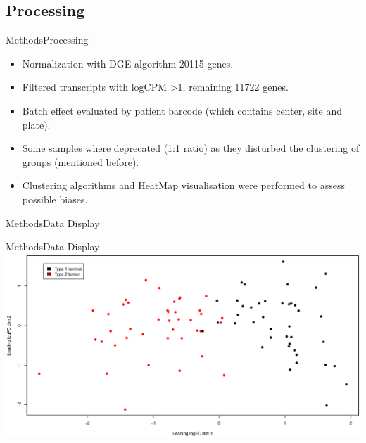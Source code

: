 \documentclass{beamer}
\begin{document}
\subsection{Processing}
\begin{frame}{Methods}{Processing}
	\begin{itemize}
		\item Normalization with DGE algorithm \cite{Robinson01012010} 20115 genes.
		\item Filtered transcripts with logCPM \textgreater 1, remaining 11722 genes.
		\item Batch effect evaluated by patient barcode  (which contains center, site and plate).
		\item Some samples where deprecated (1:1 ratio) as they disturbed the clustering of groups (mentioned before).
		\item Clustering algorithms and HeatMap visualisation were performed to assess possible biases.
	\end{itemize}

\end{frame}

\begin{frame}{Methods}{Data Display}
	\centering
	
	
  
\end{frame}

\begin{frame}{Methods}{Data Display}
  \includegraphics[width=\textwidth,height=\textheight,keepaspectratio]{mds4-1.eps}
\end{frame}
\end{document}
